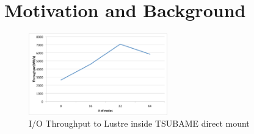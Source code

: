 \section{Motivation and Background}


\begin{figure}[tb]
	\centering
	\includegraphics[width=6cm]{throughput_tsubame}
	\caption{I/O Throughput to Lustre inside TSUBAME direct mount}
	\label{throughput TSUBAME}
\end{figure}

